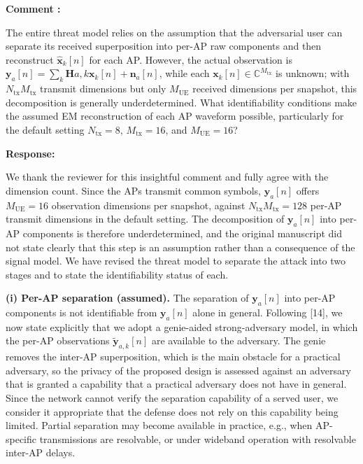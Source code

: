 \documentclass[a4paper,12pt]{article}
\newcounter{reviewcomment}
\newenvironment{reviewcomment}{%
  \stepcounter{reviewcomment}%
  \begin{shaded}
  \textbf{Comment \thereviewcomment:}\par
}{\end{shaded}}
\newenvironment{response}{\par\textbf{Response:}\par}{\par}
\begin{document}
\begin{reviewcomment}
The entire threat model relies on the assumption that the adversarial user
can separate its received superposition into per-AP raw components and then
reconstruct $\hat{\mathbf x}_k[n]$ for each AP. However, the actual
observation is
$\mathbf y_a[n]=\sum_k\mathbf H{a,k}\mathbf x_k[n]+\mathbf n_a[n]$, while
each $\mathbf x_k[n]\in\mathbb C^{M_{\mathrm{tx}}}$ is unknown; with
$N_{\mathrm{tx}}M_{\mathrm{tx}}$ transmit dimensions but only
$M_{\mathrm{UE}}$ received dimensions per snapshot, this decomposition is
generally underdetermined. What identifiability conditions make the assumed
EM reconstruction of each AP waveform possible, particularly for the default
setting $N_{\mathrm{tx}}=8$, $M_{\mathrm{tx}}=16$, and $M_{\mathrm{UE}}=16$?
\end{reviewcomment}
\begin{response}
We thank the reviewer for this insightful comment and fully agree with the
dimension count. Since the APs transmit common symbols, $\mathbf{y}_a[n]$
offers $M_{\mathrm{UE}}=16$ observation dimensions per snapshot, against
$N_{\mathrm{tx}}M_{\mathrm{tx}}=128$ per-AP transmit dimensions in the
default setting. The decomposition of $\mathbf{y}_a[n]$ into per-AP
components is therefore underdetermined, and the original manuscript did not
state clearly that this step is an assumption rather than a consequence of
the signal model. We have revised the threat model to separate the attack
into two stages and to state the identifiability status of each.

\textbf{(i) Per-AP separation (assumed).} The separation of
$\mathbf{y}_a[n]$ into per-AP components is not identifiable from
$\mathbf{y}_a[n]$ alone in general. Following [14], we now state explicitly
that we adopt a genie-aided strong-adversary model, in which the per-AP
observations $\widetilde{\mathbf{y}}_{a,k}[n]$ are available to the
adversary. The genie removes the inter-AP superposition, which is the main
obstacle for a practical adversary, so the privacy of the proposed design is
assessed against an adversary that is granted a capability that a practical
adversary does not have in general. Since the network cannot verify the
separation capability of a served user, we consider it appropriate that the
defense does not rely on this capability being limited. Partial separation
may become available in practice, e.g., when AP-specific transmissions are
resolvable, or under wideband operation with resolvable inter-AP delays.


\end{response}
\end{document}
